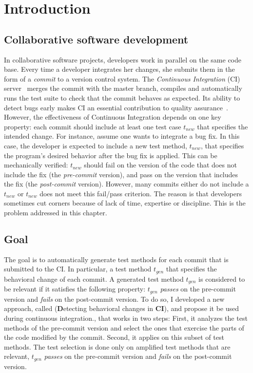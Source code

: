 \minitoc

\section{Introduction}
\label{sec:dci:introduction}

\subsection{Collaborative software development} 
\label{subsec:dci:introduction:collaborative-software-development}
In collaborative software projects, developers work in parallel on the same code base. 
Every time a developer integrates her changes, she submits them in the form of a \emph{commit} to a version control system.
The \emph{Continuous Integration} (CI) server~\cite{fowler2006continuous} merges the commit with the master branch, compiles and automatically runs the test suite to check that the commit behaves as expected.
Its ability to detect bugs early makes CI an essential contribution to quality assurance~\cite{Hilton:2016:UsageCI,duvall2007continuous}.
However, the effectiveness of Continuous Integration depends on one key property: 
each commit should include at least one test case $t_{new}$ that specifies the intended change.
For instance, assume one wants to integrate a bug fix.
In this case, the developer is expected to include a new test method, $t_{new}$, that specifies the program's desired behavior after the bug fix is applied.
This can be mechanically verified: $t_{new}$ should fail on the version of the code that does not include the fix (the \emph{pre-commit} version), and pass on the version that includes the fix (the \emph{post-commit} version).
However, many commits either do not include a $t_{new}$ or $t_{new}$ does not meet this fail/pass criterion.
The reason is that developers sometimes cut corners because of lack of time, expertise or discipline. 
This is the problem addressed in this chapter.

\subsection{Goal}
\label{subsec:dci:introduction:goal}

The goal is to automatically generate test methods for each commit that is submitted to the CI.
In particular, a test method $t_{gen}$ that specifies the behavioral change of each commit.
A generated test method $t_{gen}$ is considered to be relevant if it satisfies the following property: 
$t_{gen}$ \textit{passes} on the pre-commit version and \textit{fails} on the post-commit version.
To do so, I developed a new approach, called \DCI (\textbf{D}etecting behavioral changes in \textbf{CI}), and propose it be used during continuous integration., that works in two steps:
First, it analyzes the test methods of the pre-commit version and select the ones that exercise the parts of the code modified by the commit.
Second, it applies \dspot on this subset of test methods.
The test selection is done only on amplified test methods that are relevant, \ie $t_{gen}$ \textit{passes} on the pre-commit version and \textit{fails} on the post-commit version.

